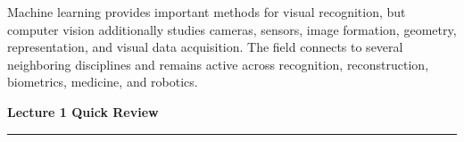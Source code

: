 \documentclass[11pt,a4paper,oneside]{report}
\begin{document}
\FloatBarrier
\begin{chaptersummary}
Machine learning provides important methods for visual recognition, but computer vision additionally studies cameras, sensors, image formation, geometry, representation, and visual data acquisition. The field connects to several neighboring disciplines and remains active across recognition, reconstruction, biometrics, medicine, and robotics.
\end{chaptersummary}

\clearpage
\vspace*{0.2em}
{}
\begin{center}
  {\sffamily\fontsize{22}{26}\selectfont\bfseries\color{Ink}Lecture 1 Quick Review\par}
  \vspace{0.35em}
  {\color{SapienzaRed}\rule{0.82\textwidth}{0.8pt}}
\end{center}
\vspace{0.25em}
\end{document}
